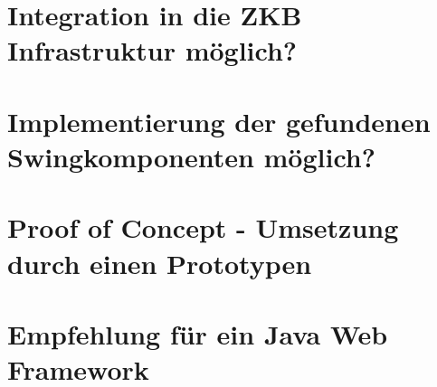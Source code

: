 \documentclass[
11pt, %
a4paper, %
BCOR25mm, %
DIV14, %
footsepline = false, %
headsepline, %
twoside, %
openright,
abstracton, %
listof=totocnumbered, %
bibliography=totocnumbered %
]{scrreprt}
\begin{document}
   
  
  \cleardoublepage
  
   
  \chapter{Integration in die ZKB Infrastruktur
  möglich?}\label{chapter:IntegrationInDieZkbInfrastrukutr}

  \cleardoublepage

   
  \chapter{Implementierung der gefundenen Swingkomponenten
  möglich?}\label{chapter:ImplementierungDerGefundenenSwingkomponenten}

  \cleardoublepage
  
  
  \chapter{Proof of Concept - Umsetzung durch einen
  Prototypen}\label{chapter:ProofOfConcept}

  \cleardoublepage  
  
   
  \chapter{Empfehlung für ein Java Web
  Framework}\label{chapter:EmpfehlungFuerEinJavaWebFramework}

  \cleardoublepage
  
   
\end{document}
